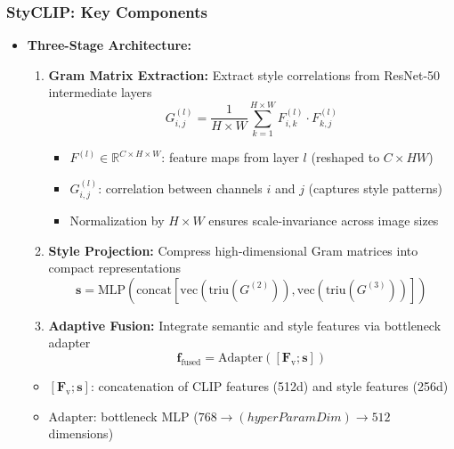 \documentclass[aspectratio=169,xcolor=dvipsnames]{beamer}
\newcommand{\Fv}{\mathbf{F}_\text{v}}      %
\newcommand{\R}{\mathbb{R}}
\begin{document}
\begin{frame}
  \frametitle{StyCLIP: Key Components}
  \begin{itemize}
    \item \textbf{Three-Stage Architecture:}
      \begin{enumerate}
 \item \textbf{Gram Matrix Extraction:} Extract style correlations from ResNet-50 intermediate layers
        \begin{equation*}
          G_{i,j}^{(l)} = \frac{1}{H \times W} \sum_{k=1}^{H \times W} F_{i,k}^{(l)} \cdot F_{k,j}^{(l)}
        \end{equation*}
        \footnotesize{
        \begin{itemize}
          \item $F^{(l)} \in \R^{C \times H \times W}$: feature maps from layer $l$ (reshaped to $C \times HW$)
          \item $G_{i,j}^{(l)}$: correlation between channels $i$ and $j$ (captures style patterns)
          \item Normalization by $H \times W$ ensures scale-invariance across image sizes
        \end{itemize}
        }
                \item \textbf{Style Projection:} Compress high-dimensional Gram matrices into compact representations
        \begin{equation*}
          \mathbf{s} = \text{MLP}(\text{concat}[\text{vec}(\text{triu}(G^{(2)})), \text{vec}(\text{triu}(G^{(3)}))])
        \end{equation*}
        
        \item \textbf{Adaptive Fusion:} Integrate semantic and style features via bottleneck adapter
        \begin{equation*}
          \mathbf{f}_{\text{fused}} =\text{Adapter}([\Fv; \mathbf{s}])
        \end{equation*}
      \end{enumerate}
      \footnotesize{
        \begin{itemize}
          \item $[\Fv; \mathbf{s}]$: concatenation of CLIP features (512d) and style features (256d)
          \item $\text{Adapter}$: bottleneck MLP ($768 \rightarrow (hyperParamDim) \rightarrow 512$ dimensions)
        \end{itemize}
        }
  \end{itemize}
\end{frame}
\end{document}
